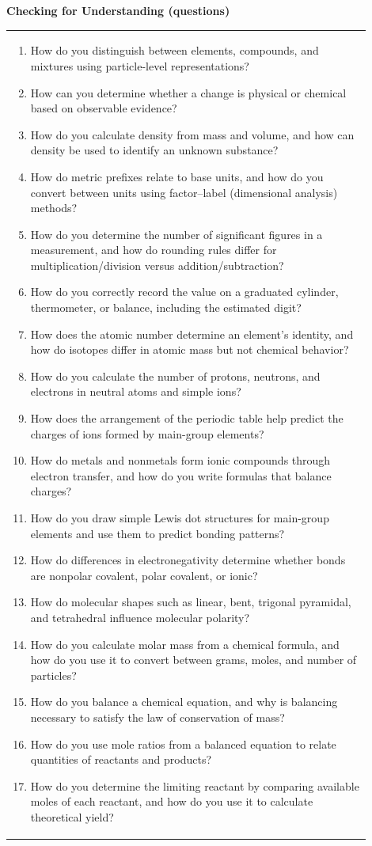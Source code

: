 \documentclass{article}
\begin{document}
\newpage
\noindent
{\large\textbf{Checking for Understanding (questions)}}\\[0.2em]
\noindent
\begin{tabular}{|p{0.9\linewidth}|}
\hline
\begin{enumerate}[label=\alph*.]

\item How do you distinguish between elements, compounds, and mixtures using particle-level representations?
\item How can you determine whether a change is physical or chemical based on observable evidence?
\item How do you calculate density from mass and volume, and how can density be used to identify an unknown substance?
\item How do metric prefixes relate to base units, and how do you convert between units using factor–label (dimensional analysis) methods?
\item How do you determine the number of significant figures in a measurement, and how do rounding rules differ for multiplication/division versus addition/subtraction?
\item How do you correctly record the value on a graduated cylinder, thermometer, or balance, including the estimated digit?
\item How does the atomic number determine an element’s identity, and how do isotopes differ in atomic mass but not chemical behavior?
\item How do you calculate the number of protons, neutrons, and electrons in neutral atoms and simple ions?
\item How does the arrangement of the periodic table help predict the charges of ions formed by main-group elements?
\item How do metals and nonmetals form ionic compounds through electron transfer, and how do you write formulas that balance charges?
\item How do you draw simple Lewis dot structures for main-group elements and use them to predict bonding patterns?
\item How do differences in electronegativity determine whether bonds are nonpolar covalent, polar covalent, or ionic?
\item How do molecular shapes such as linear, bent, trigonal pyramidal, and tetrahedral influence molecular polarity?
\item How do you calculate molar mass from a chemical formula, and how do you use it to convert between grams, moles, and number of particles?
\item How do you balance a chemical equation, and why is balancing necessary to satisfy the law of conservation of mass?
\item How do you use mole ratios from a balanced equation to relate quantities of reactants and products?
\item How do you determine the limiting reactant by comparing available moles of each reactant, and how do you use it to calculate theoretical yield?
\end{enumerate}\\[0.2cm]
\end{tabular}
\end{document}
